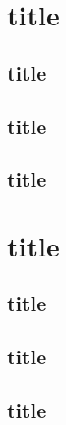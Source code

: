\documentclass[british,french,11pt, a4paper, openany]{article}
\begin{document}

\section{title}
\subsection{title}
\subsection{title}
\subsection{title}


\section{title}
\subsection{title}
\subsection{title}
\subsection{title}
\end{document}
